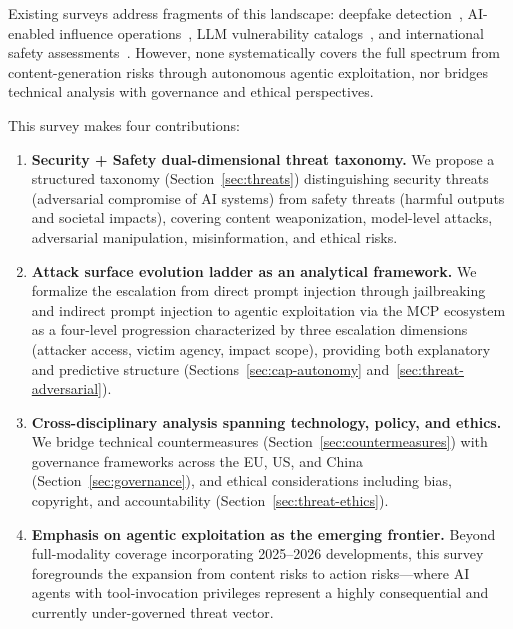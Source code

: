 
Existing surveys address fragments of this landscape: deepfake detection~\cite{pei2024deepfakesurvey}, AI-enabled influence operations~\cite{spitale2023gpt3}, LLM vulnerability catalogs~\cite{owasp2025}, and international safety assessments~\cite{aisafetyreport2025,aisafetyreport2026}. However, none systematically covers the full spectrum from content-generation risks through autonomous agentic exploitation, nor bridges technical analysis with governance and ethical perspectives.

This survey makes four contributions:
\begin{enumerate}[nosep,leftmargin=1.5em]
    \item \textbf{Security + Safety dual-dimensional threat taxonomy.} We propose a structured taxonomy (Section~\ref{sec:threats}) distinguishing security threats (adversarial compromise of AI systems) from safety threats (harmful outputs and societal impacts), covering content weaponization, model-level attacks, adversarial manipulation, misinformation, and ethical risks.
    \item \textbf{Attack surface evolution ladder as an analytical framework.} We formalize the escalation from direct prompt injection through jailbreaking and indirect prompt injection to agentic exploitation via the MCP ecosystem as a four-level progression characterized by three escalation dimensions (attacker access, victim agency, impact scope), providing both explanatory and predictive structure (Sections~\ref{sec:cap-autonomy} and~\ref{sec:threat-adversarial}).
    \item \textbf{Cross-disciplinary analysis spanning technology, policy, and ethics.} We bridge technical countermeasures (Section~\ref{sec:countermeasures}) with governance frameworks across the EU, US, and China (Section~\ref{sec:governance}), and ethical considerations including bias, copyright, and accountability (Section~\ref{sec:threat-ethics}).
    \item \textbf{Emphasis on agentic exploitation as the emerging frontier.} Beyond full-modality coverage incorporating 2025--2026 developments, this survey foregrounds the expansion from content risks to action risks---where AI agents with tool-invocation privileges represent a highly consequential and currently under-governed threat vector.
\end{enumerate}



